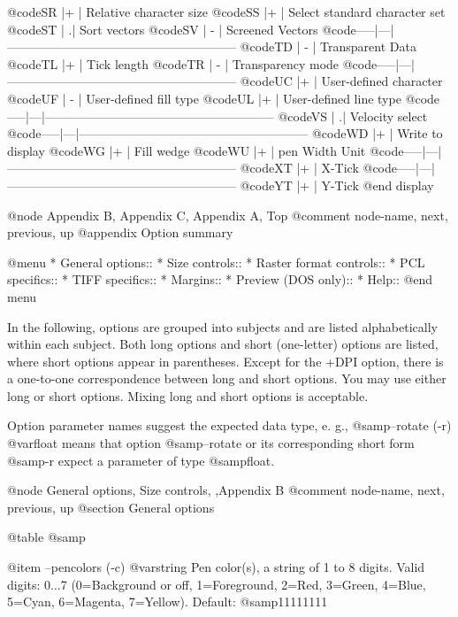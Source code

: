 @code{SR   |+  | Relative character size}
@code{SS   |+  | Select standard character set}
@code{ST   |  .| Sort vectors}
@code{SV   | - | Screened Vectors}
@code{-----|---|--------------------------------------------------------}
@code{TD   | - | Transparent Data}
@code{TL   |+  | Tick length}
@code{TR   | - | Transparency mode}
@code{-----|---|--------------------------------------------------------}
@code{UC   |+  | User-defined character}
@code{UF   | - | User-defined fill type}
@code{UL   |+  | User-defined line type}
@code{-----|---|--------------------------------------------------------}
@code{VS   |  .| Velocity select}
@code{-----|---|--------------------------------------------------------}
@code{WD   |+  | Write to display}
@code{WG   |+  | Fill wedge}
@code{WU   |+  | pen Width Unit}
@code{-----|---|--------------------------------------------------------}
@code{XT   |+  | X-Tick}
@code{-----|---|--------------------------------------------------------}
@code{YT   |+  | Y-Tick}
@end display



@node Appendix B, Appendix C, Appendix A, Top
@comment  node-name,  next,  previous,  up
@appendix   Option summary

@menu
* General options::
* Size controls::
* Raster format controls::
* PCL specifics::
* TIFF specifics::
* Margins::
* Preview (DOS only)::
* Help::
@end menu

In the following, options are grouped into subjects and
are listed alphabetically within each subject. Both long options and
short (one-letter) options are listed, where short options appear in
parentheses. Except for the +DPI option, there is a one-to-one correspondence
between long and short options. You may use either long or short options.
Mixing long and short options is acceptable.

Option parameter names suggest the expected data type, e. g.,
@samp{--rotate (-r) @var{float}} means that option @samp{--rotate} or its
corresponding short form @samp{-r} expect a parameter of type @samp{float}.

@node General options, Size controls, ,Appendix B
@comment  node-name,  next,  previous,  up
@section General options

@table @samp

@item --pencolors (-c) @var{string}
Pen color(s), a string of 1 to 8 digits.
Valid digits: 0...7 (0=Background or off, 1=Foreground, 2=Red, 3=Green,
4=Blue, 5=Cyan, 6=Magenta, 7=Yellow). Default: @samp{11111111}

